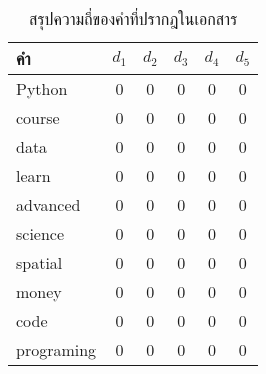 \documentclass[11pt,a4paper]{article}
\newcommand{\fir}{Python}
\newcommand{\seco}{course}
\newcommand{\thi}{data}
\newcommand{\fou}{learn}
\newcommand{\fif}{advanced}
\newcommand{\six}{science}
\newcommand{\sev}{spatial}
\newcommand{\eig}{money}
\newcommand{\nin}{code}
\newcommand{\ten}{programing}
\begin{document}
    \begin{table}[ht!]
        \centering
        \caption{สรุปความถี่ของคำที่ปรากฎในเอกสาร}
        \begin{tabular}{ p{3cm} ccccc}
            \hline
            คำ      & $d_1$ &  $d_2$    &  $d_3$    &  $d_4$    &  $d_5$    \\
            \hline \hline
            \fir    & 0     &  0        &  0        &  0        &  0        \\
            \seco   & 0     &  0        &  0        &  0        &  0        \\
            \thi    & 0     &  0        &  0        &  0        &  0        \\
            \fou    & 0     &  0        &  0        &  0        &  0        \\
            \fif    & 0     &  0        &  0        &  0        &  0        \\
            \six    & 0     &  0        &  0        &  0        &  0        \\
            \sev    & 0     &  0        &  0        &  0        &  0        \\
            \eig    & 0     &  0        &  0        &  0        &  0        \\
            \nin    & 0     &  0        &  0        &  0        &  0        \\
            \ten    & 0     &  0        &  0        &  0        &  0        \\
            \hline
        \end{tabular}
    \end{table}
\end{document}

